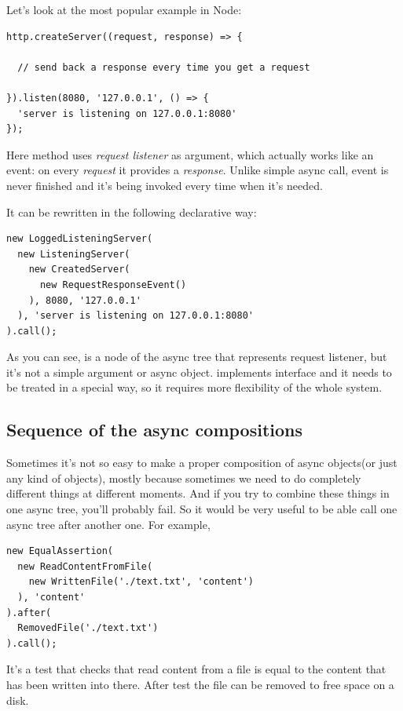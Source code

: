 \documentclass{article}
\newcommand{\cit}[1]{{\fontfamily{qcr}\selectfont{\textcolor{superdarkgray}{#1}}}}
\begin{document}
Let's look at the most popular example in Node:

\begin{lstlisting}
http.createServer((request, response) => {

  // send back a response every time you get a request

}).listen(8080, '127.0.0.1', () => {
  'server is listening on 127.0.0.1:8080'
});
\end{lstlisting}

Here method \cit{createServer} uses \textit{request listener} as argument, which actually works like an event: on every \textit{request} it provides a  \textit{response}. Unlike simple async call, event is never finished and it's being invoked every time when it's needed.

It can be rewritten in the following declarative way:

\begin{lstlisting}
new LoggedListeningServer(
  new ListeningServer(
    new CreatedServer(
      new RequestResponseEvent()
    ), 8080, '127.0.0.1'
  ), 'server is listening on 127.0.0.1:8080'
).call();
\end{lstlisting}

As you can see, \cit{RequestResponseEvent} is a node of the async tree that represents request listener, but it's not a simple argument or async object. \cit{RequestResponseEvent} implements \cit{Event} interface and it needs to be treated in a special way, so it requires more flexibility of the whole system.

\subsection{Sequence of the async compositions}

Sometimes it's not so easy to make a proper composition of async objects(or just any kind of objects), mostly because sometimes we need to do completely different things at different moments. And if you try to combine these things in one async tree, you'll probably fail. So it would be very useful to be able call one async tree after another one. For example,

\begin{lstlisting}
new EqualAssertion(
  new ReadContentFromFile(
    new WrittenFile('./text.txt', 'content')
  ), 'content'
).after(
  RemovedFile('./text.txt')
).call();
\end{lstlisting}

It's a test that checks that read content from a file is equal to the content that has been written into there. After test the file can be removed to free space on a disk.
\end{document}
